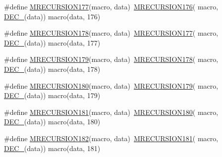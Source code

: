 \begin{DoxyCompactItemize}
\item 
\#define \mbox{\hyperlink{group__group__sam0__utils__mrecursion_ga91b7223f3d5817342eec1d975ab07d8d}{M\+R\+E\+C\+U\+R\+S\+I\+O\+N177}}(macro,  data)~\mbox{\hyperlink{group__group__sam0__utils__mrecursion_gac99e671e0d43b04a1f6bb626ce84b1a7}{M\+R\+E\+C\+U\+R\+S\+I\+O\+N176}}(  macro, \mbox{\hyperlink{group__group__sam0__utils__mrecursion_ga1d23d683797679dca8c3512a54a5dcae}{D\+E\+C\+\_\+}}(data))   macro(data, 176)
\item 
\#define \mbox{\hyperlink{group__group__sam0__utils__mrecursion_ga10c159986773d51f28784bb35f5dac4c}{M\+R\+E\+C\+U\+R\+S\+I\+O\+N178}}(macro,  data)~\mbox{\hyperlink{group__group__sam0__utils__mrecursion_ga91b7223f3d5817342eec1d975ab07d8d}{M\+R\+E\+C\+U\+R\+S\+I\+O\+N177}}(  macro, \mbox{\hyperlink{group__group__sam0__utils__mrecursion_ga1d23d683797679dca8c3512a54a5dcae}{D\+E\+C\+\_\+}}(data))   macro(data, 177)
\item 
\#define \mbox{\hyperlink{group__group__sam0__utils__mrecursion_gaf2dbd67d5e3cf26998df6bf3bcb687c9}{M\+R\+E\+C\+U\+R\+S\+I\+O\+N179}}(macro,  data)~\mbox{\hyperlink{group__group__sam0__utils__mrecursion_ga10c159986773d51f28784bb35f5dac4c}{M\+R\+E\+C\+U\+R\+S\+I\+O\+N178}}(  macro, \mbox{\hyperlink{group__group__sam0__utils__mrecursion_ga1d23d683797679dca8c3512a54a5dcae}{D\+E\+C\+\_\+}}(data))   macro(data, 178)
\item 
\#define \mbox{\hyperlink{group__group__sam0__utils__mrecursion_ga1f3f8c01c7a9e963459f2101c3a89518}{M\+R\+E\+C\+U\+R\+S\+I\+O\+N180}}(macro,  data)~\mbox{\hyperlink{group__group__sam0__utils__mrecursion_gaf2dbd67d5e3cf26998df6bf3bcb687c9}{M\+R\+E\+C\+U\+R\+S\+I\+O\+N179}}(  macro, \mbox{\hyperlink{group__group__sam0__utils__mrecursion_ga1d23d683797679dca8c3512a54a5dcae}{D\+E\+C\+\_\+}}(data))   macro(data, 179)
\item 
\#define \mbox{\hyperlink{group__group__sam0__utils__mrecursion_gad1cb96b447fac701830cdbdf69fd4f3d}{M\+R\+E\+C\+U\+R\+S\+I\+O\+N181}}(macro,  data)~\mbox{\hyperlink{group__group__sam0__utils__mrecursion_ga1f3f8c01c7a9e963459f2101c3a89518}{M\+R\+E\+C\+U\+R\+S\+I\+O\+N180}}(  macro, \mbox{\hyperlink{group__group__sam0__utils__mrecursion_ga1d23d683797679dca8c3512a54a5dcae}{D\+E\+C\+\_\+}}(data))   macro(data, 180)
\item 
\#define \mbox{\hyperlink{group__group__sam0__utils__mrecursion_ga4bce301f66e1986fd89df43d3d7a6fd9}{M\+R\+E\+C\+U\+R\+S\+I\+O\+N182}}(macro,  data)~\mbox{\hyperlink{group__group__sam0__utils__mrecursion_gad1cb96b447fac701830cdbdf69fd4f3d}{M\+R\+E\+C\+U\+R\+S\+I\+O\+N181}}(  macro, \mbox{\hyperlink{group__group__sam0__utils__mrecursion_ga1d23d683797679dca8c3512a54a5dcae}{D\+E\+C\+\_\+}}(data))   macro(data, 181)

\end{DoxyCompactItemize}
